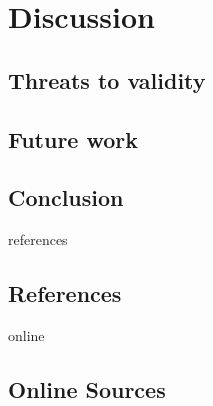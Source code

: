 \documentclass[12pt,a4paper]{report}
\begin{document}
\chapter{Discussion} \label{chap:discussion}

\section{Threats to validity} \label{sect:threats-to-validity}

\section{Future work} \label{sect:future-work}

\section{Conclusion} \label{sect:conclusion}






\newpage
{}
\listoffigures
\newpage
{}
\listoftables
\newpage
{}

\begin{btSect}{references}
\section*{\huge{References}}
\btPrintCited
\end{btSect}
\begin{btSect}{online}
\section*{\huge{Online Sources}}
\btPrintCited
\end{btSect}
\end{document}
